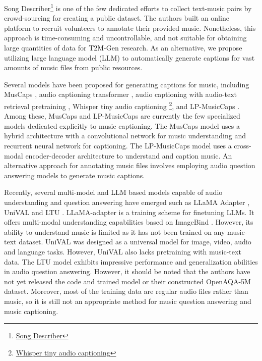 \documentclass{article}
\begin{document}
Song Describer\footnote{\href{https://ismir2022program.ismir.net/lbd_405.html}{Song Describer}} is one of the few dedicated efforts to collect text-music pairs by crowd-sourcing for creating a public dataset. The authors built an online platform to recruit volunteers to annotate their provided music. Nonetheless, this approach is time-consuming and uncontrollable, and not suitable for obtaining large quantities of data for T2M-Gen research. As an alternative, we propose utilizing large language model (LLM) to automatically generate captions for vast amounts of music files from public resources.



Several models have been proposed for generating captions for music, including MusCaps \cite{Manco_2021}, audio captioning transformer \cite{mei2021audio}, audio captioning with audio-text retrieval pretraining \cite{xu2022sjtu}, Whisper tiny audio captioning \footnote{\href{https://huggingface.co/MU-NLPC/whisper-tiny-audio-captioning}{Whisper tiny audio captioning}}, and LP-MusicCaps \cite{doh2023lpmusiccaps}. Among these, MusCaps and LP-MusicCaps are currently the few specialized models dedicated explicitly to music captioning. The MusCaps model uses a hybrid architecture with a convolutional network for music understanding and recurrent neural network  for captioning. The LP-MusicCaps model uses a cross-modal encoder-decoder architecture to understand and caption music. An alternative approach for annotating music files involves employing audio question answering models to generate music captions.

Recently, several multi-model and LLM based models capable of audio understanding and question answering have emerged such as LLaMA Adapter \cite{zhang2023llamaadapter}, UniVAL \cite{shukor2023unified} and LTU \cite{gong2023listen}. LLaMA-adapter is a training scheme for finetuning LLMs. It offers multi-modal understanding capabilities based on ImageBind \cite{girdhar2023imagebind}. However, its ability to understand music is limited as it has not been trained on any music-text dataset. UniVAL was designed as a universal model for image, video, audio and language tasks. However, UniVAL also lacks pretraining with music-text data. The LTU model exhibits impressive performance and generalization abilities in audio question answering. However, it should be noted that the authors have not yet released the code and trained model or their constructed OpenAQA-5M dataset. Moreover, most of the training data are regular audio files rather than music, so it is still not an appropriate method for music question answering and music captioning.
\end{document}
